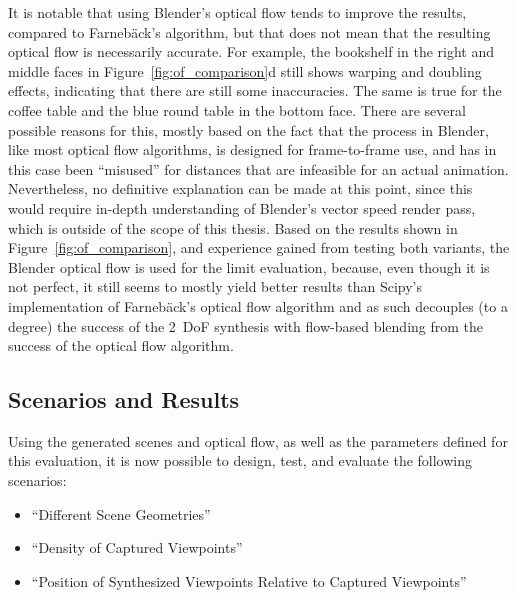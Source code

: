 It is notable that using Blender's optical flow tends to improve the results, compared to Farneb\"ack's algorithm, but that does not mean that the resulting optical flow is necessarily accurate. For example, the bookshelf in the right and middle faces in Figure~\ref{fig:of_comparison}d still shows warping and doubling effects, indicating that there are still some inaccuracies. The same is true for the coffee table and the blue round table in the bottom face. There are several possible reasons for this, mostly based on the fact that the process in Blender, like most optical flow algorithms, is designed for frame-to-frame use, and has in this case been ``misused'' for distances that are infeasible for an actual animation. Nevertheless, no definitive explanation can be made at this point, since this would require in-depth understanding of Blender's vector speed render pass, which is outside of the scope of this thesis. Based on the results shown in Figure~\ref{fig:of_comparison}, and experience gained from testing both variants, the Blender optical flow is used for the limit evaluation, because, even though it is not perfect, it still seems to mostly yield better results than Scipy's implementation of Farneb\"ack's optical flow algorithm and as such decouples (to a degree) the success of the 2~DoF synthesis with flow-based blending from the success of the optical flow algorithm.


\subsection{Scenarios and Results}
Using the generated scenes and optical flow, as well as the parameters defined for this evaluation, it is now possible to design, test, and evaluate the following scenarios:
\begin{itemize}
  \item ``Different Scene Geometries''
  \item ``Density of Captured Viewpoints''
  \item ``Position of Synthesized Viewpoints Relative to Captured Viewpoints''
\end{itemize}

